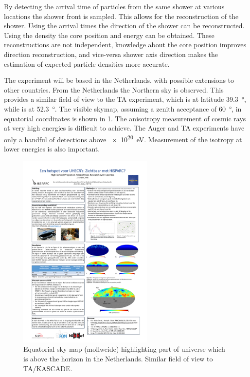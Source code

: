 By detecting the arrival time of particles from the same shower at various locations the shower front is sampled. This allows for the reconstruction of the shower. Using the arrival times the direction of the shower can be reconstructed. Using the density the core position and energy can be obtained. These reconstructions are not independent, knowledge about the core position improves direction reconstruction, and vice-versa shower axis direction makes the estimation of expected particle densities more accurate.

The experiment will be based in the Netherlands, with possible extensions to other countries. From the Netherlands the Northern sky is observed. This provides a similar field of view to the TA experiment, which is at latitude \SI{39.3}{\degree}, while \nikhef is at \SI{52.3}{\degree}. The visible skymap, assuming a zenith acceptance of \SI{60}{\degree}, in equatorial coordinates is shown in \cref{fig:visible_sky_map}. The anisotropy measurement of cosmic rays at very high energies is difficult to achieve. The Auger and TA experiments have only a handful of detections above \SI{e20}{\eV}. Measurement of the isotropy at lower energies is also important.

\begin{figure}
    \centering
    \includegraphics[width=0.6\textwidth]
                    {plots/experiment/visible_sky_map}
    \caption{Equatorial sky map (mollweide) highlighting part of universe which is above the horizon in the Netherlands. Similar field of view to TA/KASCADE.}
    \label{fig:visible_sky_map}
\end{figure}


